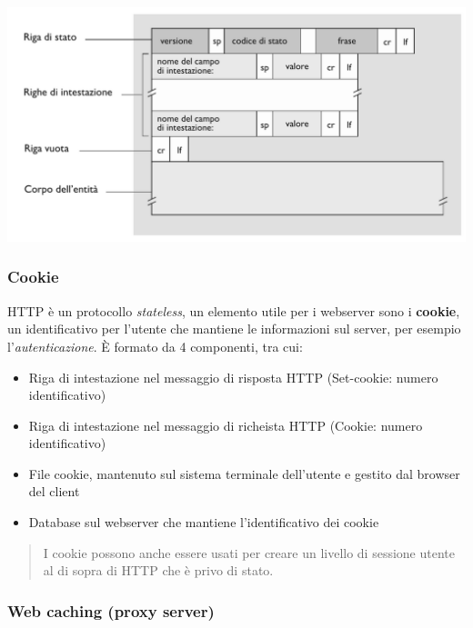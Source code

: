 \includegraphics[width=\textwidth]{./img/rispostahttp.png}

\subsubsection{Cookie}
HTTP è un protocollo \textit{stateless}, un elemento utile per i webserver sono i \textbf{cookie}, un identificativo per l'utente che mantiene le informazioni sul server, per esempio l'\textit{autenticazione}.
È formato da 4 componenti, tra cui:
\begin{itemize}
  \item Riga di intestazione nel messaggio di risposta HTTP (Set-cookie: numero identificativo)
  \item Riga di intestazione nel messaggio di richeista HTTP (Cookie: numero identificativo)
  \item File cookie, mantenuto sul sistema terminale dell'utente e gestito dal browser del client
  \item Database sul webserver che mantiene l'identificativo dei cookie
\end{itemize}

\begin{quote}
  I cookie possono anche essere usati per creare un livello di sessione utente al di sopra di HTTP che è privo di stato.
\end{quote}

\subsubsection{Web caching (proxy server)}

